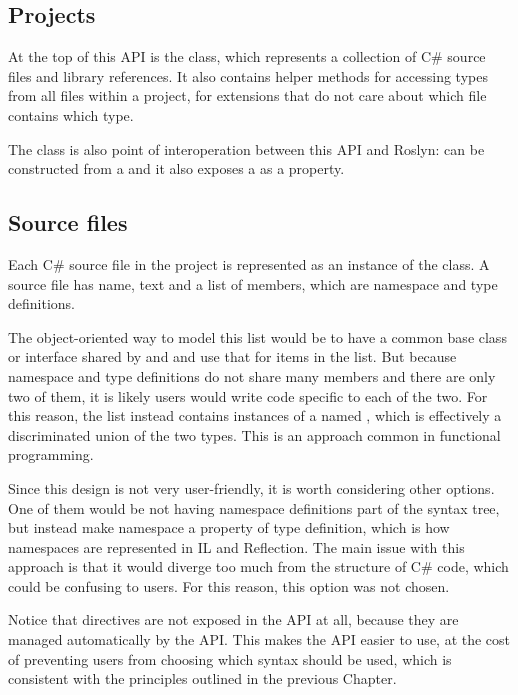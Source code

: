 \subsection{Projects}

At the top of this \ac{API} is the  class, which represents a collection of C\# source files and library references. It also contains helper methods for accessing types from all files within a project, for extensions that do not care about which file contains which type.

The  class is also point of interoperation between this \ac{API} and Roslyn:  can be constructed from a  and it also exposes a  as a property.

\subsection{Source files}

Each C\# source file in the project is represented as an instance of the  class. A source file has name, text and a list of members, which are namespace and type definitions.

The object-oriented way to model this list would be to have a common base class or interface shared by  and  and use that for items in the list. But because namespace and type definitions do not share many members and there are only two of them, it is likely users would write code specific to each of the two. For this reason, the list instead contains instances of a  named , which is effectively a discriminated union of the two types. This is an approach common in functional programming.

Since this design is not very user-friendly, it is worth considering other options. One of them would be not having namespace definitions part of the syntax tree, but instead make namespace a property of type definition, which is how namespaces are represented in \ac{IL} and Reflection. The main issue with this approach is that it would diverge too much from the structure of C\# code, which could be confusing to users. For this reason, this option was not chosen.

Notice that  directives are not exposed in the \ac{API} at all, because they are managed automatically by the \ac{API}. This makes the \ac{API} easier to use, at the cost of preventing users from choosing which syntax should be used, which is consistent with the principles outlined in the previous Chapter.

